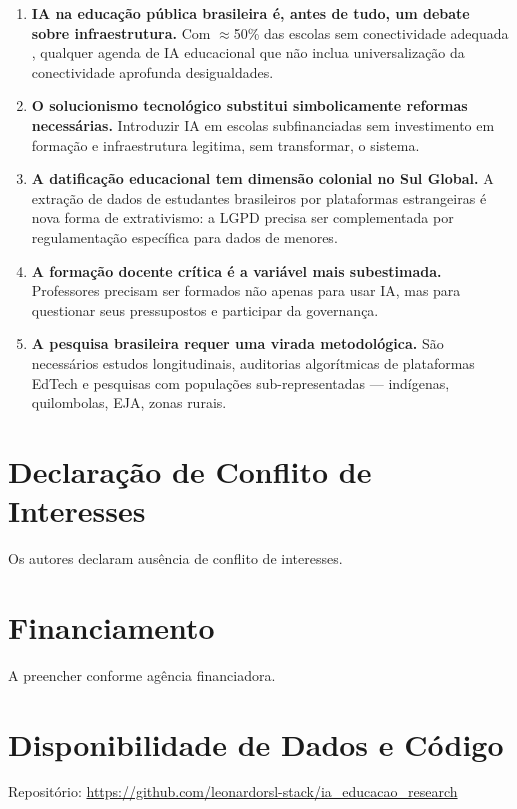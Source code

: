 \documentclass[preprint,12pt,authoryear]{elsarticle}
\begin{document}
\begin{enumerate}

\item \textbf{IA na educação pública brasileira é, antes de tudo,
um debate sobre infraestrutura.}
Com $\approx$50\% das escolas sem conectividade adequada
\citep{CGIbr2023}, qualquer agenda de IA educacional que não inclua
universalização da conectividade aprofunda desigualdades.

\item \textbf{O solucionismo tecnológico substitui simbolicamente
reformas necessárias.}
Introduzir IA em escolas subfinanciadas sem investimento em
formação e infraestrutura legitima, sem transformar, o sistema.

\item \textbf{A datificação educacional tem dimensão colonial no
Sul Global.}
A extração de dados de estudantes brasileiros por plataformas
estrangeiras é nova forma de extrativismo: a LGPD precisa ser
complementada por regulamentação específica para dados de menores.

\item \textbf{A formação docente crítica é a variável mais
subestimada.}
Professores precisam ser formados não apenas para usar IA, mas
para questionar seus pressupostos e participar da governança.

\item \textbf{A pesquisa brasileira requer uma virada metodológica.}
São necessários estudos longitudinais, auditorias algorítmicas
de plataformas EdTech e pesquisas com populações sub-representadas
--- indígenas, quilombolas, EJA, zonas rurais.

\end{enumerate}

\section*{Declaração de Conflito de Interesses}
Os autores declaram ausência de conflito de interesses.

\section*{Financiamento}
A preencher conforme agência financiadora.

\section*{Disponibilidade de Dados e Código}
Repositório: \url{https://github.com/leonardorsl-stack/ia_educacao_research}
\end{document}

